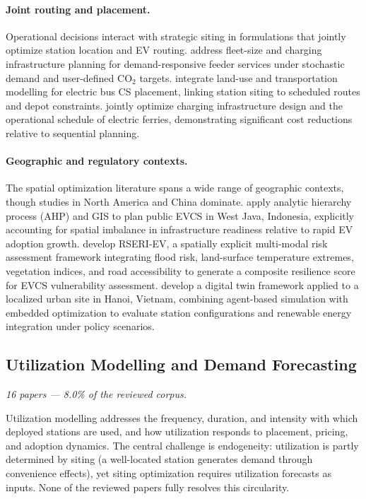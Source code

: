 \documentclass[12pt,letterpaper]{article}
\begin{document}
\paragraph{Joint routing and placement.}
Operational decisions interact with strategic siting in formulations
that jointly optimize station location and EV routing.
\citet{nakao2025} address fleet-size and charging infrastructure planning
for demand-responsive feeder services under stochastic demand and
user-defined CO$_2$ targets.  \citet{zhong2025} integrate land-use and
transportation modelling for electric bus CS placement, linking station
siting to scheduled routes and depot constraints.  \citet{bertucci2026}
jointly optimize charging infrastructure design and the operational
schedule of electric ferries, demonstrating significant cost reductions
relative to sequential planning.

\paragraph{Geographic and regulatory contexts.}
The spatial optimization literature spans a wide range of geographic
contexts, though studies in North America and China dominate.
\citet{fariza2026} apply analytic hierarchy process (AHP) and GIS
to plan public EVCS in West Java, Indonesia, explicitly accounting for
spatial imbalance in infrastructure readiness relative to rapid EV
adoption growth.  \citet{karakus2025} develop RSERI-EV, a spatially
explicit multi-modal risk assessment framework integrating flood risk,
land-surface temperature extremes, vegetation indices, and road
accessibility to generate a composite resilience score for EVCS
vulnerability assessment.  \citet{do2025} develop a digital twin
framework applied to a localized urban site in Hanoi, Vietnam, combining
agent-based simulation with embedded optimization to evaluate station
configurations and renewable energy integration under policy scenarios.

\subsection{Utilization Modelling and Demand Forecasting}

\textit{16 papers --- 8.0\% of the reviewed corpus.}

Utilization modelling addresses the frequency, duration, and intensity
with which deployed stations are used, and how utilization responds to
placement, pricing, and adoption dynamics.  The central challenge is
endogeneity: utilization is partly determined by siting (a well-located
station generates demand through convenience effects), yet siting
optimization requires utilization forecasts as inputs.  None of the
reviewed papers fully resolves this circularity.
\end{document}
